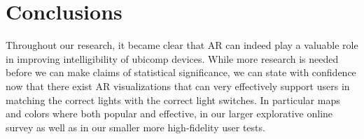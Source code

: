 \chapter{Conclusions} \label{chap:concl}
Throughout our research, it became clear that AR can indeed play a valuable role in improving intelligibility of ubicomp devices. While more research is needed before we can make claims of statistical significance, we can state with confidence now that there exist AR visualizations that can very effectively support users in matching the correct lights with the correct light switches. In particular maps and colors where both popular and effective, in our larger explorative online survey as well as in our smaller more high-fidelity user tests.



